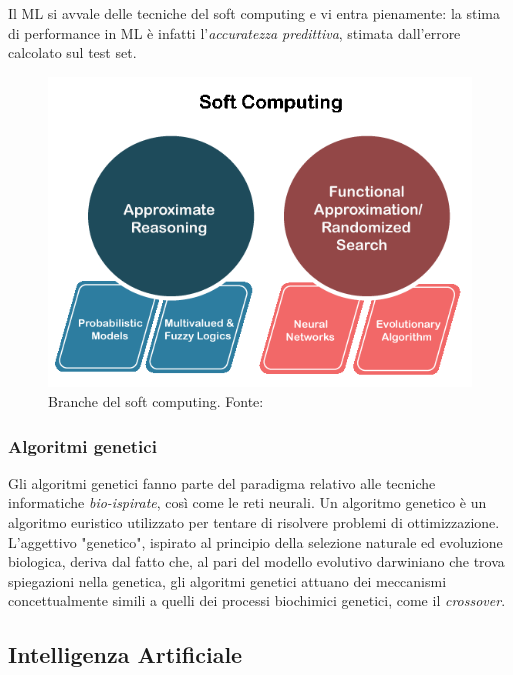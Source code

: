 Il ML si avvale delle tecniche del soft computing \supercite{MLwiki} e vi entra pienamente: la stima di performance in ML è infatti l'\textit{accuratezza predittiva}, stimata dall'errore calcolato sul test set.

\begin{figure}[!h]
	\centering
	\includegraphics[scale=0.4]{images/soft-computing.png}
	\caption{Branche del soft computing. Fonte: \cite{softComputing}}
	\label{fig:soft-computing}
\end{figure}

\subsubsection{Algoritmi genetici}

\par Gli algoritmi genetici fanno parte del paradigma relativo alle tecniche informatiche \textit{bio-ispirate}, così come le reti neurali. Un algoritmo genetico è un algoritmo euristico utilizzato per tentare di risolvere problemi di ottimizzazione. L'aggettivo "genetico", ispirato al principio della selezione naturale ed evoluzione biologica, deriva dal fatto che, al pari del modello evolutivo darwiniano che trova spiegazioni nella genetica, gli algoritmi genetici attuano dei meccanismi concettualmente simili a quelli dei processi biochimici genetici, come il \textit{crossover}.

\subsection{Intelligenza Artificiale}

